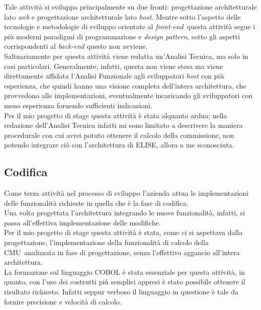 	Tale attività si sviluppa principalmente su due fronti: progettazione architetturale lato \textit{web} e progettazione architetturale lato \textit{host}. Mentre sotto l'aspetto delle tecnologie e metodologie di sviluppo orientate al \textit{front-end}\glossario\ questa attività segue i più moderni paradigmi di programmazione e \textit{design pattern}, sotto gli aspetti corrispondenti al \textit{back-end} questo non avviene.\\
	
	Saltuariamente per questa attività viene redatta un'Analisi Tecnica, ma solo in casi particolari. Generalmente, infatti, questa non viene stesa ma viene direttamente affidata l'Analisi Funzionale agli sviluppatori \textit{host} con più esperienza, che quindi hanno una visione completa dell'intera architettura, che provvedono alle implementazioni, eventualmente incaricando gli sviluppatori con meno esperienza fornendo sufficienti indicazioni.\\

	Per il mio progetto di stage questa attività è stata alquanto ardua; nella redazione dell'Analisi Tecnica infatti mi sono limitato a descrivere la maniera procedurale con cui avrei potuto ottenere il calcolo della commissione, non potendo integrare ciò con l'architettura di ELISE, allora a me sconosciuta.
	 	
\subsection{Codifica}
	
	Come terza attività nel processo di sviluppo l'azienda attua le implementazioni delle funzionalità richieste in quella che è la fase di codifica.\\	
		
	Una volta progettata l'architettura integrando le nuove funzionalità, infatti, si passa all'effettiva implementazione delle modifiche.\\

	Per il mio progetto di stage questa attività è stata, come ci si aspettava dalla progettazione, l'implementazione della funzionalità di calcolo della CMU\glossario\ analizzata in fase di progettazione, senza l'effettivo aggancio all'intera architettura.\\
	
	La formazione sul linguaggio COBOL è stata essenziale per questa attività, in quanto, con l'uso dei costrutti più semplici appresi è stato possibile ottenere il risultato richiesto. Infatti seppur verboso il linguaggio in questione è tale da fornire precisione e velocità di calcolo.
	
